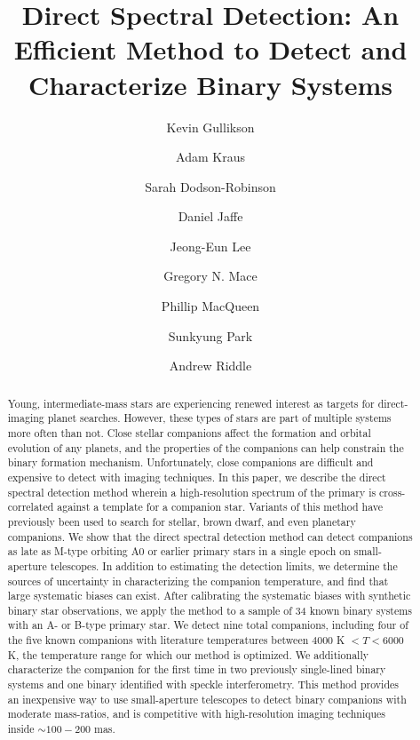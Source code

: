 \documentclass{emulateapj}
\begin{document}
\title{Direct Spectral Detection: An Efficient Method to Detect and Characterize Binary Systems}

\author{Kevin Gullikson }
\author{Adam Kraus }
\author{Sarah Dodson-Robinson }
\author{Daniel Jaffe }
\author{Jeong-Eun Lee }
\author{Gregory N. Mace }
\author{Phillip MacQueen }
\author{Sunkyung Park }
\author{Andrew Riddle }




\begin{abstract}
Young, intermediate-mass stars are experiencing renewed interest as targets for direct-imaging planet searches. However, these types of stars are part of multiple systems more often than not. Close stellar companions affect the formation and orbital evolution of any planets, and the properties of the companions can help constrain the binary formation mechanism. Unfortunately, close companions are difficult and expensive to detect with imaging techniques. In this paper, we describe the direct spectral detection method wherein a high-resolution spectrum of the primary is cross-correlated against a template for a companion star. Variants of this method have previously been used to search for stellar, brown dwarf, and even planetary companions. We show that the direct spectral detection method can detect companions as late as M-type orbiting A0 or earlier primary stars in a single epoch on small-aperture telescopes. In addition to estimating the detection limits, we determine the sources of uncertainty in characterizing the companion temperature, and find that large systematic biases can exist. After calibrating the systematic biases with synthetic binary star observations, we apply the method to a sample of 34 known binary systems with an A- or B-type primary star. We detect nine total companions, including four of the five known companions with literature temperatures between $4000$ K $ < T < 6000$ K, the temperature range for which our method is optimized. We additionally characterize the companion for the first time in two previously single-lined binary systems and one binary identified with speckle interferometry. This method provides an inexpensive way to use small-aperture telescopes to detect binary companions with moderate mass-ratios, and is competitive with high-resolution imaging techniques inside $\sim 100-200$ mas.
\end{abstract}
\end{document}
